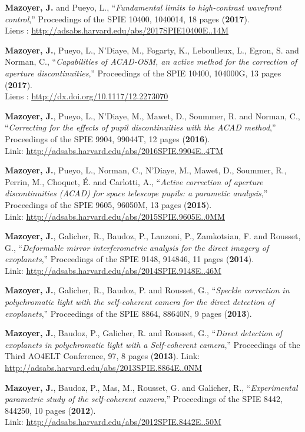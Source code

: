 \documentclass[11pt,a4paper, french]{article}
\begin{document}
\begin{etaremune}

\item \textbf{Mazoyer, J.} and Pueyo, L., “\textit{Fundamental limits to high-contrast wavefront control},” Proceedings of the SPIE 10400, 1040014, 18 pages (\textbf{2017}).\\
Liens : \textcolor{BrickRed}{\underline{\url{http://adsabs.harvard.edu/abs/2017SPIE10400E..14M}}}
\item \textbf{Mazoyer, J.}, Pueyo, L., N’Diaye, M., Fogarty, K., Leboulleux, L., Egron, S. and Norman, C., “\textit{Capabilities of ACAD-OSM, an active method for the correction of aperture discontinuities},” Proceedings of the SPIE 10400, 104000G, 13 pages (\textbf{2017}).\\
Liens : \textcolor{BrickRed}{\underline{\url{http://dx.doi.org/10.1117/12.2273070}}}
\item \textbf{Mazoyer, J.}, Pueyo, L., N’Diaye, M., Mawet, D., Soummer, R. and Norman, C., “\textit{Correcting for the effects of pupil discontinuities with the ACAD method},” Proceedings of the SPIE 9904, 99044T, 12 pages (\textbf{2016}).\\
Link: \textcolor{BrickRed}{\underline{\url{http://adsabs.harvard.edu/abs/2016SPIE.9904E..4TM}}}
\item \textbf{Mazoyer, J.}, Pueyo, L., Norman, C., N’Diaye, M., Mawet, D., Soummer, R., Perrin, M., Choquet, É. and Carlotti, A., “\textit{Active correction of aperture discontinuities (ACAD) for space telescope pupils: a parametic analysis},” Proceedings of the SPIE 9605, 96050M, 13 pages (\textbf{2015}).\\
Link: \textcolor{BrickRed}{\underline{\url{http://adsabs.harvard.edu/abs/2015SPIE.9605E..0MM}}}
\item \textbf{Mazoyer, J.}, Galicher, R., Baudoz, P., Lanzoni, P., Zamkotsian, F. and Rousset, G., “\textit{Deformable mirror interferometric analysis for the direct imagery of exoplanets},” Proceedings of the SPIE 9148, 914846, 11 pages (\textbf{2014}).\\
Link: \textcolor{BrickRed}{\underline{\url{http://adsabs.harvard.edu/abs/2014SPIE.9148E..46M}}}
\item \textbf{Mazoyer, J.}, Galicher, R., Baudoz, P. and Rousset, G., “\textit{Speckle correction in polychromatic light with the self-coherent camera for the direct detection of exoplanets},” Proceedings of the SPIE 8864, 88640N, 9 pages (\textbf{2013}).\\
\item \textbf{Mazoyer, J.}, Baudoz, P., Galicher, R. and Rousset, G., “\textit{Direct detection of exoplanets in polychromatic light with a Self-coherent camera},” Proceedings of the Third AO4ELT Conference, 97, 8 pages (\textbf{2013}).
Link: \textcolor{BrickRed}{\underline{\url{http://adsabs.harvard.edu/abs/2013SPIE.8864E..0NM}}}
\item \textbf{Mazoyer, J.}, Baudoz, P., Mas, M., Rousset, G. and Galicher, R., “\textit{Experimental parametric study of the self-coherent camera},” Proceedings of the SPIE 8442, 844250, 10 pages (\textbf{2012}).\\
Link: \textcolor{BrickRed}{\underline{\url{http://adsabs.harvard.edu/abs/2012SPIE.8442E..50M}}}



\end{etaremune}
\end{document}
